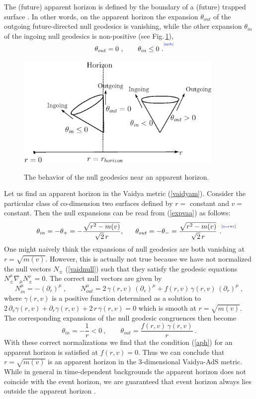 \documentclass[12pt]{article}
\newcommand{\be}{\begin{equation}}
\newcommand{\ee}{\end{equation}}
\def\fig#1{Fig.\,\ref{#1}}
\def\req#1{(\ref{#1})}
\def\({\left (}
\def\){\right )}
\def\p{\partial}
\def\s{\sigma}
\def\p{\partial}
\def\f#1#2{{\frac{#1}{#2}}}
\def\f#1#2{{\frac{#1}{#2}}}
\def\p{\partial}
\def\Label#1{\label{#1}%
{ \color{blue}{\smash{\hbox to0pt{\raise2ex\hbox{\tiny[#1]}\hss}}}}}
\def\s{\sqrt}
\def\de{\partial}
\def\f {\frac}
\begin{document}
The (future) apparent horizon is defined by the boundary of a
(future) trapped surface \cite{Hawking:1973uf}. In other words, on
the apparent horizon the expansion $\theta_{out}$ of the outgoing
future-directed null geodesics is vanishing, while the other expansion
$\theta_{in}$ of the ingoing null geodesics is non-positive (see
\fig{apparenth}),
%
 \be \theta_{out}=0\ , \qquad \theta_{in}\leq 0 \ .
\Label{aph}\ee
%
\begin{figure}
\begin{center}
  \includegraphics[width=10cm]{apparent}\\
  \caption{The behavior of the null geodesics near an apparent horizon.}\label{apparenth}
\end{center}
\end{figure}

Let us find an apparent horizon in the Vaidya metric \req{vaidyam}.
Consider the particular class of co-dimension two surfaces defined by
$r=$ constant and $v=$ constant. Then the null expansions can be read from
\req{expvaa} as follows:
%
\be \theta_{in}=-\theta_+=-\f{\s{r^2-m(v)}}{\s{2}\, r},\ \ \ \ \
\theta_{out}=-\theta_-=\f{\s{r^2-m(v)}}{\s{2}\, r}\ .
\Label{norwr}\ee
%
One might naively think the expansions of null geodesics are both
vanishing at $r=\s{m(v)}$. However, this is actually not true
because we have not normalized the null vectors $N_{\pm}$
\req{vaidnull} such that they satisfy the geodesic equations
$N_{\pm}^\mu\nabla_{\! \mu} N_{\pm}^\nu=0$. The correct null vectors
are given by
%
\be N_{in}^\mu= -\(\p_r\)^\mu \ , \qquad
N_{out}^\mu=2\, \gamma(r,v)\, \(\p_v\)^\mu + f(r,v) \, \gamma(r,v) \, \(\p_r\)^\mu
\ ,
\ee
%
where $\gamma(r,v)$ is a positive function determined as a solution
to $2 \, \de_v \gamma(r,v)+\de_r\gamma(r,v)+2 \, r \, \gamma(r,v)=0$ which is
smooth at $r=\s{m(v)}$. The corresponding expansions of the null
geodesic congruences then become
%
\be \theta_{in}=-\f{1}{r}<0 \ , \qquad
\theta_{out}=\f{f(r,v) \, \gamma(r,v)}{r}\ .
\ee
%
With these correct normalizations we find that the condition
\req{aph} for an apparent horizon is satisfied at $f(r,v) =0 $. Thus
we can conclude that $r=\s{m(v)}$ is an apparent horizon in the
3-dimensional Vaidya-AdS metric.  While in  general in time-dependent
backgrounds the apparent horizon does not coincide with the event
horizon, we are guaranteed that event horizon  always lies outside the apparent horizon \cite{Hawking:1973uf}.
\end{document}
